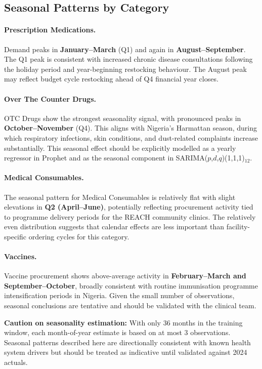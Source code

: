 \documentclass[12pt, a4paper]{article}
\begin{document}
\subsection{Seasonal Patterns by Category}

\paragraph{Prescription Medications.}
Demand peaks in \textbf{January--March} (Q1) and again in
\textbf{August--September}. The Q1 peak is consistent with increased
chronic disease consultations following the holiday period and
year-beginning restocking behaviour. The August peak may reflect
budget cycle restocking ahead of Q4 financial year closes.

\paragraph{Over The Counter Drugs.}
OTC Drugs show the strongest seasonality signal, with pronounced peaks
in \textbf{October--November} (Q4). This aligns with Nigeria's Harmattan
season, during which respiratory infections, skin conditions, and
dust-related complaints increase substantially. This seasonal effect
should be explicitly modelled as a yearly regressor in Prophet and
as the seasonal component in SARIMA($p$,$d$,$q$)(1,1,1)$_{12}$.

\paragraph{Medical Consumables.}
The seasonal pattern for Medical Consumables is relatively flat with
slight elevations in \textbf{Q2 (April--June)}, potentially reflecting
procurement activity tied to programme delivery periods for the
REACH community clinics. The relatively even distribution suggests
that calendar effects are less important than facility-specific
ordering cycles for this category.

\paragraph{Vaccines.}
Vaccine procurement shows above-average activity in
\textbf{February--March and September--October}, broadly consistent
with routine immunisation programme intensification periods in Nigeria.
Given the small number of observations, seasonal conclusions are
tentative and should be validated with the clinical team.

\begin{mdframed}[style=warnbox]
\textbf{Caution on seasonality estimation:} With only 36 months in
the training window, each month-of-year estimate is based on at most
3 observations. Seasonal patterns described here are directionally
consistent with known health system drivers but should be treated as
indicative until validated against 2024 actuals.
\end{mdframed}
\end{document}
